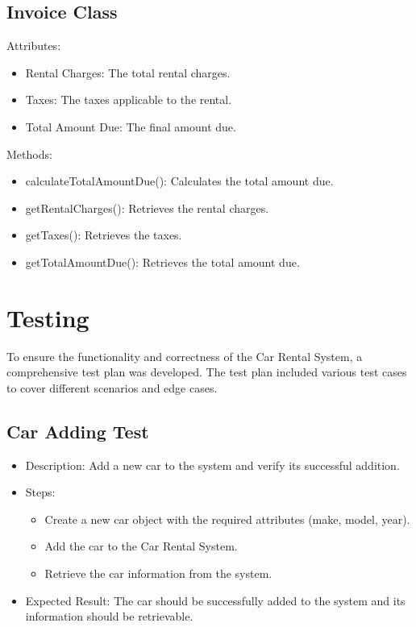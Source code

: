 \documentclass{article}
\begin{document}
\subsection{Invoice Class}
Attributes:
\begin{itemize}
    \item Rental Charges: The total rental charges.
    \item Taxes: The taxes applicable to the rental.
    \item Total Amount Due: The final amount due.
\end{itemize}

Methods:
\begin{itemize}
    \item calculateTotalAmountDue(): Calculates the total amount due.
    \item getRentalCharges(): Retrieves the rental charges.
    \item getTaxes(): Retrieves the taxes.
    \item getTotalAmountDue(): Retrieves the total amount due.
\end{itemize}

\section{Testing}

To ensure the functionality and correctness of the Car Rental System, a comprehensive test plan was developed. The test plan included various test cases to cover different scenarios and edge cases.

\subsection{Car Adding Test}
\begin{itemize}
\item Description: Add a new car to the system and verify its successful addition.
\item Steps:
\begin{itemize}
\item Create a new car object with the required attributes (make, model, year).
\item Add the car to the Car Rental System.
\item Retrieve the car information from the system.
\end{itemize}
\item Expected Result: The car should be successfully added to the system and its information should be retrievable.
\end{itemize}
\end{document}
